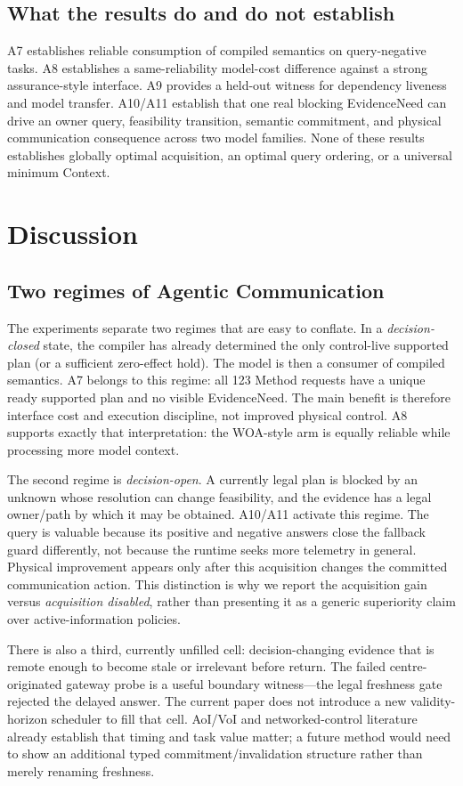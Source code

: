 \documentclass[journal,10pt]{IEEEtran}
\begin{document}
\subsection{What the results do and do not establish}
A7 establishes reliable consumption of compiled semantics on query-negative tasks. A8 establishes
a same-reliability model-cost difference against a strong assurance-style interface. A9 provides
a held-out witness for dependency liveness and model transfer. A10/A11 establish that one real
blocking EvidenceNeed can drive an owner query, feasibility transition, semantic commitment, and
physical communication consequence across two model families. None of these results establishes
globally optimal acquisition, an optimal query ordering, or a universal minimum Context.

\section{Discussion}
\label{sec:discussion}
\subsection{Two regimes of Agentic Communication}
The experiments separate two regimes that are easy to conflate. In a \emph{decision-closed}
state, the compiler has already determined the only control-live supported plan (or a sufficient
zero-effect hold). The model is then a consumer of compiled semantics. A7 belongs to this regime:
all 123 Method requests have a unique ready supported plan and no visible EvidenceNeed. The main
benefit is therefore interface cost and execution discipline, not improved physical control. A8
supports exactly that interpretation: the WOA-style arm is equally reliable while processing more
model context.

The second regime is \emph{decision-open}. A currently legal plan is blocked by an unknown whose
resolution can change feasibility, and the evidence has a legal owner/path by which it may be
obtained. A10/A11 activate this regime. The query is valuable because its positive and negative
answers close the fallback guard differently, not because the runtime seeks more telemetry in
general. Physical improvement appears only after this acquisition changes the committed
communication action. This distinction is why we report the acquisition gain versus
\emph{acquisition disabled}, rather than presenting it as a generic superiority claim over
active-information policies.

There is also a third, currently unfilled cell: decision-changing evidence that is remote enough
to become stale or irrelevant before return. The failed centre-originated gateway probe is a
useful boundary witness---the legal freshness gate rejected the delayed answer. The current paper
does not introduce a new validity-horizon scheduler to fill that cell. AoI/VoI and networked-control
literature already establish that timing and task value matter; a future method would need to show
an additional typed commitment/invalidation structure rather than merely renaming freshness.
\end{document}
